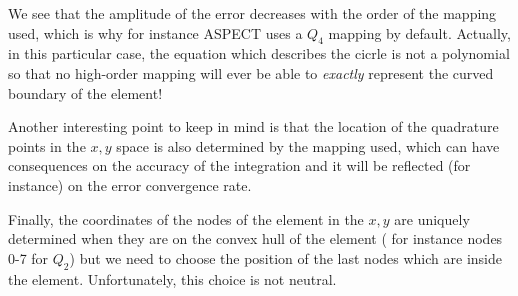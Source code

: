 We see that the amplitude of the error decreases with the order of the mapping used, 
which is why for instance ASPECT uses a $Q_4$ mapping by default.
Actually, in this particular case, the equation which describes the cicrle is not a 
polynomial so that no high-order mapping will ever be able to {\it exactly} 
represent the curved boundary of the element!

Another interesting point to keep in mind is that the location of the quadrature points
in the $x,y$ space is also determined by the mapping used, which can have consequences
on the accuracy of the integration and it will be reflected (for instance) on the 
error convergence rate.

Finally, the coordinates of the nodes of the element in the $x,y$ are 
uniquely determined when they are on the convex hull of the element (
for instance nodes 0-7 for $Q_2$) but we need to choose the position 
of the last nodes which are inside the element. Unfortunately, this choice is 
not neutral. 











 
